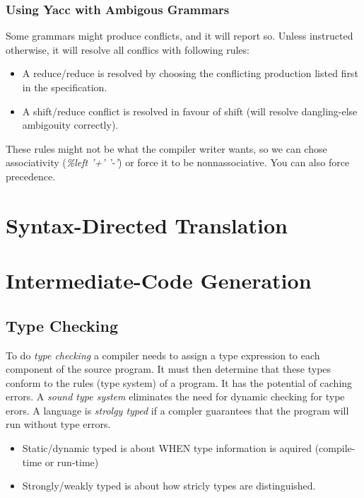 \documentclass{article}
\begin{document}
\subsubsection{Using Yacc with Ambigous Grammars} %
\label{ssub:Using Yacc with Ambigous Grammars}
Some grammars might produce conflicts, and it will report so. Unless instructed otherwise, it will resolve all conflics with following rules:
\begin{itemize}
	\item A reduce/reduce is resolved by choosing the conflicting production listed first in the specification.
	\item A shift/reduce conflict is resolved in favour of shift (will resolve dangling-else ambigouity correctly).
\end{itemize}
These rules might not be what the compiler writer wants, so we can chose associativity (\emph{\%left '+' '-'}) or force it to be nonnassociative. You can also force precedence.

\section{Syntax-Directed Translation} %
\label{sec:Syntax-Directed Translation}


\section{Intermediate-Code Generation} %
\label{sec:Intermediate-Code Generation}
\subsection{Type Checking} %
\label{sub:Type Checking}
To do \emph{type checking} a compiler needs to assign a type expression to each component of the source program. It must then determine that these types conform to the rules (type system) of a program. It has the potential of caching errors. A \emph{sound type system} eliminates the need for dynamic checking for type erors. A language is \emph{strolgy typed} if a compler guarantees that the program will run without type errors.
\begin{itemize}
	\item Static/dynamic typed is about WHEN type information is aquired (compile-time or run-time)
	\item Strongly/weakly typed is about how stricly types are distinguished.
\end{itemize}
\end{document}
